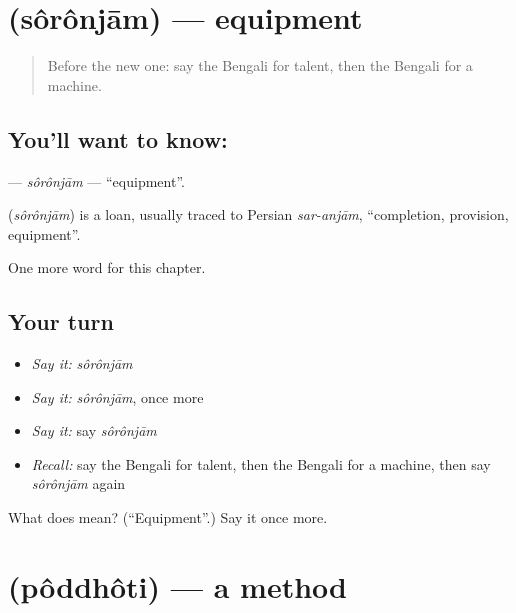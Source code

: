 \section[\texorpdfstring{\bn{সরঞ্জাম} (sôrônjām)}{সরঞ্জাম (sôrônjām)}]{ (sôrônjām) — equipment}

\label{lesson:BN-C100-soronjam}



\begin{quote}
Before the new one: say the Bengali for talent, then the Bengali for a machine.
\end{quote}

\subsection*{You'll want to know: }
\textbf{} — \emph{sôrônjām} — \textquotedblleft{}equipment\textquotedblright{}.

\begin{cousinweb}
\textbf{} (\emph{sôrônjām}) is a loan, usually traced to Persian \emph{sar-anjām}, \textquotedblleft{}completion, provision, equipment\textquotedblright{}.
\end{cousinweb}

\begin{grammarlens}[title={What you've built}]
One more word for this chapter.
\end{grammarlens}

\subsection*{Your turn}
\begin{itemize}
\raggedright
  \item \emph{Say it:} \emph{sôrônjām}
  \item \emph{Say it:} \emph{sôrônjām}, once more
  \item \emph{Say it:} say \emph{sôrônjām}
  \item \emph{Recall:} say the Bengali for talent, then the Bengali for a machine, then say \emph{sôrônjām} again
\end{itemize}

\begin{tcolorbox}[breakable,colback=teal!4,colframe=teal!35!black,title={Before you move on}]
What does  mean? (\textquotedblleft{}Equipment\textquotedblright{}.) Say it once more.
\end{tcolorbox}
\section[\texorpdfstring{\bn{পদ্ধতি} (pôddhôti)}{পদ্ধতি (pôddhôti)}]{ (pôddhôti) — a method}

